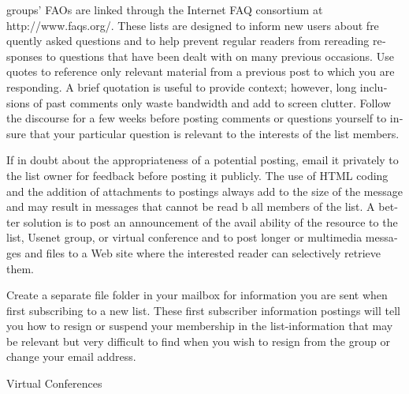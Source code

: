 \documentclass[a4paper,12pt]{article}
\begin{document}
\begin{latin}
\noindent
groups'  FAOs  are  linked  through the Internet  FAQ consortium at\\ http://www.faqs.org/.
 These lists  are designed to inform new  users about fre­ quently asked questions and  to  help   prevent regular readers from rereading responses to questions that  have  been  dealt  with  on  many  previous occasions. Use quotes to reference only  relevant material  from a previous post to which  you are  responding. A brief quotation is  useful  to provide context; however, long inclusions of past comments only  waste  bandwidth and  add  to screen clutter. Follow the  discourse  for  a few  weeks before  posting comments or  questions
yourself to  insure that  your particular question is relevant to the  interests of the list  members.

\vspace{0.1cm}
\vspace{0.1cm}
\vspace{0.1cm}
\noindent
If in doubt about the appropriateness of a potential  posting, email it privately to the list  owner for  feedback before posting it publicly.
The use of HTML coding and  the  addition of attachments to postings always add to  the  size of the  message and may  result in messages that cannot be read  b
all  members of the  list. A better solution  is to post  an announcement of the  avail­ ability  of the  resource to the  list, Usenet group, or virtual conference and to post longer or multimedia messages and  files  to a Web site where the   interested reader can selectively  retrieve them.


\vspace{0.1cm}
\vspace{0.1cm}
\vspace{0.1cm}
\noindent
Create a separate file folder in your mailbox for information you are  sent  when first subscribing to a new  list.  These  first subscriber information postings will tell you how  to resign  or suspend your membership in the  list-information that may be relevant but  very difficult to find  when you wish  to resign from the group or change your email address.


Virtual  Conferences





\end{latin}
\end{document}
